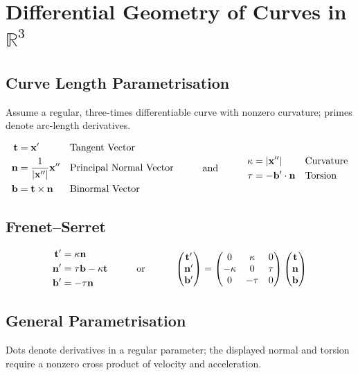 \documentclass{article}
\theoremstyle{definition}
\theoremstyle{remark}
\DeclarePairedDelimiter{\abs}{\lvert}{\rvert}
\newcommand{\RR}{\mathbb{R}}
\newcommand{\pmqty}[1]{\begin{pmatrix}#1\end{pmatrix}}
\newcommand{\qand}{\quad\text{and}\quad}
\newcommand{\qor}{\quad\text{or}\quad}
\newcommand{\qq}[1]{\quad\text{#1}\quad}
\newcommand{\cross}{\times}
\newcommand{\vdot}{\cdot}
\begin{document}
\section*{Differential Geometry of Curves in \(\RR^3\)}

\subsection*{Curve Length Parametrisation}
Assume a regular, three-times differentiable curve with nonzero curvature; primes denote arc-length derivatives.


\[
    \begin{aligned}
        \vb{t} &= \vb{x}' && \text{Tangent Vector} \\
        \vb{n} &= \frac{1}{\abs{\vb{x}''}} \vb{x}'' && \text{Principal Normal Vector} \\
        \vb{b} &= \vb{t} \cross \vb{n} && \text{Binormal Vector}
    \end{aligned}
    \qq{\qq{\qand}}
    \begin{aligned}
        \kappa &= \abs{\vb{x} ''} && \text{Curvature} \\
        \tau &= - \vb{b}' \vdot \vb{n} && \text{Torsion}
    \end{aligned}
\]

\subsection*{Frenet--Serret}

\[
    \begin{aligned}
        \vb{t}' &= \kappa \vb{n} \\
        \vb{n}' &= \tau \vb{b} - \kappa \vb{t} \\
        \vb{b}' &= - \tau \vb{n}
    \end{aligned}
    \qq{\qq{\qor}}
    \pmqty{\vb{t}' \\ \vb{n}' \\ \vb{b}'}
    =
    \pmqty{
        0 & \kappa & 0 \\
        -\kappa & 0 & \tau \\
        0 & -\tau & 0
    }
    \pmqty{\vb{t} \\ \vb{n} \\ \vb{b}}
\]

\subsection*{General Parametrisation}
Dots denote derivatives in a regular parameter; the displayed normal and torsion require a nonzero cross product of velocity and acceleration.
\end{document}
